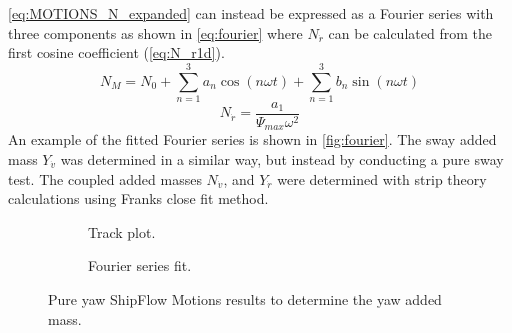 \autoref{eq:MOTIONS_N_expanded} can instead be expressed as a Fourier series with three components as shown in \autoref{eq:fourier} where $N_{\dot{r}}$ can be calculated from the first cosine coefficient (\autoref{eq:N_r1d}).
\begin{equation}
    N_M = N_0 + \sum_{n=1}^3a_n \cos(n \omega t) + \sum_{n=1}^3b_n \sin(n \omega t) 
    \label{eq:fourier}
\end{equation}
\begin{equation}
    N_{\dot{r}} = \frac{a_1}{\Psi_{max} \omega^{2}}
    \label{eq:N_r1d}
\end{equation}
An example of the fitted Fourier series is shown in \autoref{fig:fourier}. The sway added mass $Y_{\dot{v}}$ was determined in a similar way, but instead by conducting a pure sway test. The coupled added masses $N_{\dot{v}}$, and $Y_{\dot{r}}$ were determined with strip theory calculations using Franks close fit method.
\begin{figure}[h]
    \centering
    \begin{subfigure}[b]{0.49\textwidth}
        
        \caption{Track plot.}
    \end{subfigure}
    \hfill
    \begin{subfigure}[b]{0.49\textwidth}
        
        \caption{Fourier series fit.}
    \end{subfigure}
    \caption{Pure yaw ShipFlow Motions results to determine the yaw added mass.}
    \label{fig:fourier}
\end{figure}